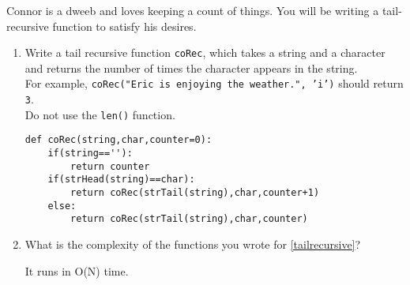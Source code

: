 Connor is a dweeb and loves keeping a count of things.
You will be writing a tail-recursive function to satisfy his desires.
\begin{enumerate}

\item
\label{tailrecursive}
Write a tail recursive function \texttt{coRec}, which takes a string and a character and returns the number of times the character appears in the string. \\
For example, \texttt{coRec("Eric is enjoying the weather.", 'i')} should return \texttt{3}. \\
Do not use the \texttt{len()} function.
\begin{answer}
\begin{lstlisting}
def coRec(string,char,counter=0):
    if(string==''):
        return counter
    if(strHead(string)==char):
        return coRec(strTail(string),char,counter+1)
    else:
        return coRec(strTail(string),char,counter)
\end{lstlisting}
\end{answer}

\item
What is the complexity of the functions you wrote for \ref{tailrecursive}?
\begin{answer}

It runs in O(N) time. \\
\end{answer}
\end{enumerate}
